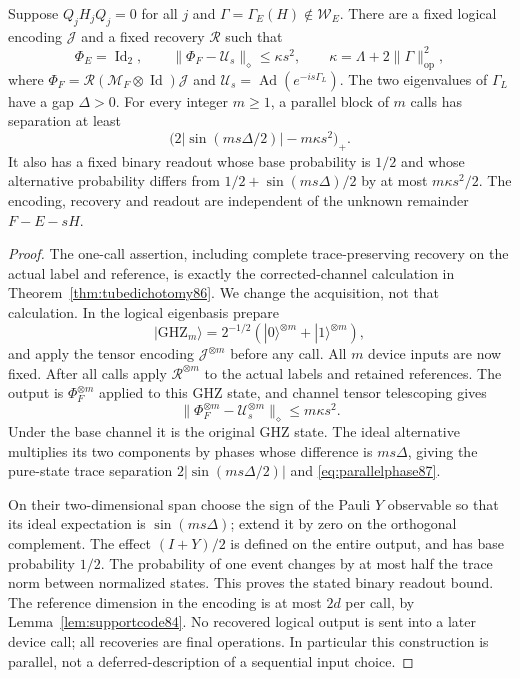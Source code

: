 \begin{lemma}\label{lem:parallelcode87}
Suppose $Q_jH_jQ_j=0$ for all $j$ and
$\Gamma=\Gamma_E(H)\notin\mathcal W_E$.  There are a fixed logical
encoding $\mathcal J$ and a fixed recovery $\mathcal R$ such that
\[
 \Phi_E=\operatorname{Id}_2,\qquad
 \|\Phi_F-\mathcal U_s\|_\diamond\le\kappa s^2,
 \qquad
 \kappa=\Lambda+2\|\Gamma\|_{\mathrm{op}}^2,
\]
where $\Phi_F=\mathcal R(\mathcal M_F\otimes\operatorname{Id})
\mathcal J$ and $\mathcal U_s=\operatorname{Ad}(e^{-is\Gamma_L})$.
The two eigenvalues of $\Gamma_L$ have a gap $\Delta>0$.
For every integer $m\ge1$, a parallel block of $m$ calls has
separation at least
\begin{equation}\label{eq:parallelphase87}
 \bigl(2|\sin(ms\Delta/2)|-m\kappa s^2\bigr)_+.
\end{equation}
It also has a fixed binary readout whose base probability is $1/2$
and whose alternative probability differs from
$1/2+\sin(ms\Delta)/2$ by at most $m\kappa s^2/2$.
The encoding, recovery and readout are independent of the unknown
remainder $F-E-sH$.
\end{lemma}
\begin{proof}
The one-call assertion, including complete trace-preserving recovery
on the actual label and reference, is exactly the corrected-channel
calculation in Theorem~\ref{thm:tubedichotomy86}.  We change the
acquisition, not that calculation.  In the logical eigenbasis prepare
\[
 |\mathrm{GHZ}_m\rangle
   =2^{-1/2}(|0\rangle^{\otimes m}+|1\rangle^{\otimes m}),
\]
and apply the tensor encoding $\mathcal J^{\otimes m}$ before any
call.  All $m$ device inputs are now fixed.  After all calls apply
$\mathcal R^{\otimes m}$ to the actual labels and retained references.
The output is $\Phi_F^{\otimes m}$ applied to this GHZ state, and
channel tensor telescoping gives
\[
 \|\Phi_F^{\otimes m}-\mathcal U_s^{\otimes m}\|_\diamond
 \le m\kappa s^2.
\]
Under the base channel it is the original GHZ state.  The ideal
alternative multiplies its two components by phases whose difference
is $ms\Delta$, giving the pure-state trace separation
$2|\sin(ms\Delta/2)|$ and \eqref{eq:parallelphase87}.

On their two-dimensional span choose the sign of the Pauli $Y$
observable so that its ideal expectation is $\sin(ms\Delta)$;
extend it by zero on the orthogonal complement.  The effect
$(I+Y)/2$ is defined on the entire output, and has base probability
$1/2$.  The probability of one event changes by at most half the
trace norm between normalized states.  This proves the stated
binary readout bound.  The reference dimension in the encoding is
at most $2d$ per call, by Lemma~\ref{lem:supportcode84}.
No recovered logical output is sent into a later device call; all
recoveries are final operations.  In particular this construction
is parallel, not a deferred-description of a sequential input choice.
\end{proof}

